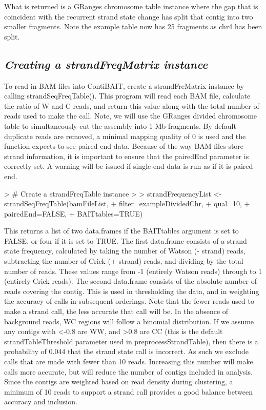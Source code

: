 \documentclass{article}
\begin{document}
What is returned is a GRanges chromosome table instance where the gap that is coincident with the recurrent strand state change has split that contig into two smaller fragments. Note the example table now has 25 fragments as chr4 has been split.

\subsection{\textit{Creating a strandFreqMatrix instance}}

To read in BAM files into ContiBAIT, create a strandFreMatrix instance by calling strandSeqFreqTable().  This program will read each BAM file, calculate the ratio of W and C reads, and return this value along with the total number of reads used to make the call. Note, we will use the GRanges divided chromosome table to simultaneously cut the assembly into 1 Mb fragments.  By default duplicate reads are removed, a minimal mapping quality of 0 is used and the function expects to see paired end data. Because of the way BAM files store strand information, it is important to ensure that the pairedEnd parameter is correctly set. A warning will be issued if single-end data is run as if it is paired-end.

\begin{Schunk}
\begin{Sinput}
> # Create a strandFreqTable instance 
> 
> strandFrequencyList <- strandSeqFreqTable(bamFileList, 
+ filter=exampleDividedChr,
+ qual=10, 
+ pairedEnd=FALSE,
+ BAITtables=TRUE)
\end{Sinput}
\end{Schunk}

This returns a list of two data.frames if the BAITtables argument is set to FALSE, or four if it is set to TRUE.  The first data.frame consists of a strand state frequency, calculated by taking the number of Watson (- strand) reads, subtracting the number of Crick (+ strand) reads, and dividing by the total number of reads.  These values range from -1 (entirely Watson reads) through to 1 (entirely Crick reads).  The second data.frame consists of the absolute number of reads covering the contig. This is used in thresholding the data, and in weighting the accuracy of calls in subsequent orderings. Note that the fewer reads used to make a strand call, the less accurate that call will be. In the absence of background reads, WC regions will follow a binomial distribution. If we assume any contigs with <-0.8 are WW, and >0.8 are CC (this is the default strandTableThreshold parameter used in preprocessStrandTable), then there is a probability of 0.044 that the strand state call is incorrect. As such we exclude calls that are made with fewer than 10 reads. Increasing this number will make calls more accurate, but will reduce the number of contigs included in analysis. Since the contigs are weighted based on read density during clustering, a minimum of 10 reads to support a strand call provides a good balance between accuracy and inclusion.
\end{document}
